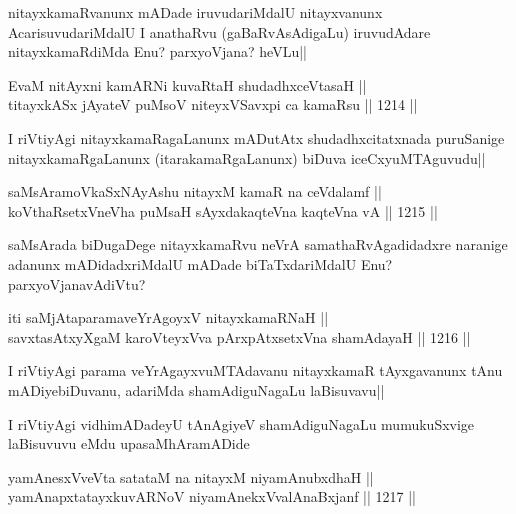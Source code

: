 \begin{artha}
nitayxkamaRvanunx mADade iruvudariMdalU nitayxvanunx AcarisuvudariMdalU I anathaRvu (gaBaRvAsAdigaLu) iruvudAdare nitayxkamaRdiMda Enu? parxyoVjana? heVLu||
\end{artha}

\begin{shl}
EvaM nitAyxni kamARNi kuvaRtaH shudadhxceVtasaH || \\
titayxkASx jAyateV puMsoV niteyxVSavxpi ca kamaRsu ||  1214 ||  
\end{shl}

\begin{artha}
I riVtiyAgi nitayxkamaRagaLanunx mADutAtx shudadhxcitatxnada puruSanige nitayxkamaRgaLanunx (itarakamaRgaLanunx) biDuva iceCxyuMTAguvudu||
\end{artha}


\begin{shl}
saMsAramoVkaSxNAyA\s \s shu nitayxM kamaR na ceVdalamf || \\
koV\s thaRsetxVneVha puMsaH sAyxdakaqteVna kaqteVna vA ||  1215 ||  
\end{shl}

\begin{artha}
saMsArada biDugaDege nitayxkamaRvu neVrA samathaRvAgadidadxre naranige adanunx mADidadxriMdalU mADade biTaTxdariMdalU Enu?parxyoVjanavAdiVtu?
\end{artha}

\begin{shl}
iti saMjAtaparamaveYrAgoyxV nitayxkamaRNaH || \\
savxtasAtxyXgaM karoVteyxVva pArxpAtxsetxVna shamAdayaH ||  1216 ||  
\end{shl}

\begin{artha}
I riVtiyAgi parama veYrAgayxvuMTAdavanu nitayxkamaR tAyxgavanunx tAnu mADiyebiDuvanu, adariMda shamAdiguNagaLu laBisuvavu||
\end{artha}

\begin{center}
I riVtiyAgi vidhimADadeyU tAnAgiyeV shamAdiguNagaLu mumukuSxvige laBisuvuvu eMdu upasaMhAramADide
\end{center}


\begin{shl}
yamAnesxVveVta satataM na nitayxM niyamAnubxdhaH || \\
yamAnapxtatayxkuvARNoV niyamAnekxVvalAnaBxjanf ||  1217 ||  
\end{shl}

